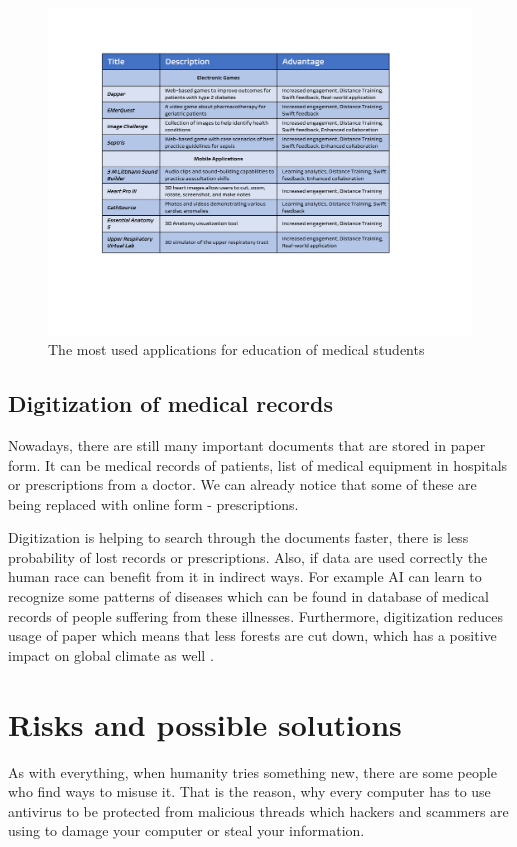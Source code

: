 \documentclass[10pt,twoside,english,a4paper]{article}
\begin{document}
\begin{figure}[tbh]
\centering
\includegraphics[width=1.0\linewidth]{table1.pdf}
\caption{The most used applications for education of medical students}
\label{f:table 1}
\end{figure}



\subsection{Digitization of medical records} \label{bureau}
Nowadays, there are still many important documents that are stored in paper form. It can be medical records of patients, list of medical equipment in hospitals or prescriptions from a doctor. We can already notice that some of these are being replaced with online form - prescriptions. 

Digitization is helping to search through the documents faster, there is less probability of lost records or prescriptions. Also, if data are used correctly the human race can benefit from it in indirect ways. For example AI can learn to recognize some patterns of diseases which can be found in database of medical records of people suffering from these illnesses. Furthermore, digitization reduces usage of paper which means that less forests are cut down, which has a positive impact on global climate as well \cite{Digitization}.


%
%
%

\section{Risks and possible solutions} \label{risks}
As with everything, when humanity tries something new, there are some people who find ways to misuse it. That is the reason, why every computer has to use antivirus to be protected from malicious threads which hackers and scammers are using to damage your computer or steal your information.
\end{document}
